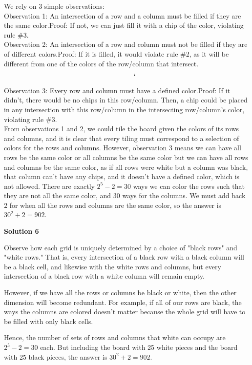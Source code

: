 \begin{enumerate}
We rely on 3 simple observations:
 \[~~~~~~~~~\]Observation 1: An intersection of a row and a column must be filled if they are the same color.Proof: If not, we can just fill it with a chip of the color, violating rule \#3.
 \[~~~~~~~~~\]Observation 2: An intersection of a row and column must not be filled if they are of different colors.Proof: If it is filled, it would violate rule \#2, as it will be different from one of the colors of the row/column that intersect.
 \[~~~~~~~`\]Observation 3: Every row and column must have a defined color.Proof: If it didn't, there would be no chips in this row/column. Then, a chip could be placed in any intersection with this row/column in the intersecting row/column's color, violating rule \#3.
 \[~~~~~~~~~~~~~~\]From observations 1 and 2, we could tile the board given the colors of its rows and columns, and it is clear that every tiling must correspond to a selection of colors for the rows and columns. However, observation 3 means we can have all rows be the same color or all columns be the same color but we can have all rows and columns be the same color, as if all rows were white but a column was black, that column can't have any chips, and it doesn't have a defined color, which is not allowed. There are exactly $2^5-2=30$ ways we can color the rows such that they are not all the same color, and $30$ ways for the columns. We must add back $2$ for when all the rows and columns are the same color, so the answer is $30^2+2=\boxed{902}.$




\textbf{Solution 6}

Observe how each grid is uniquely determined by a choice of "black rows" and "white rows." That is, every intersection of a black row with a black column will be a black cell, and likewise with the white rows and columns, but every intersection of a black row with a white column will remain empty. 

 However, if we have all the rows or columns be black or white, then the other dimension will become redundant. For example, if all of our rows are black, the ways the columns are colored doesn't matter because the whole grid will have to be filled with only black cells. 

 Hence, the number of sets of rows and columns that white can occupy are $2^{5} - 2 = 30$ each. But including the board with 25 white pieces and the board with 25 black pieces, the answer is $30^{2}+2 = \boxed{902}$.

 




\end{enumerate}
